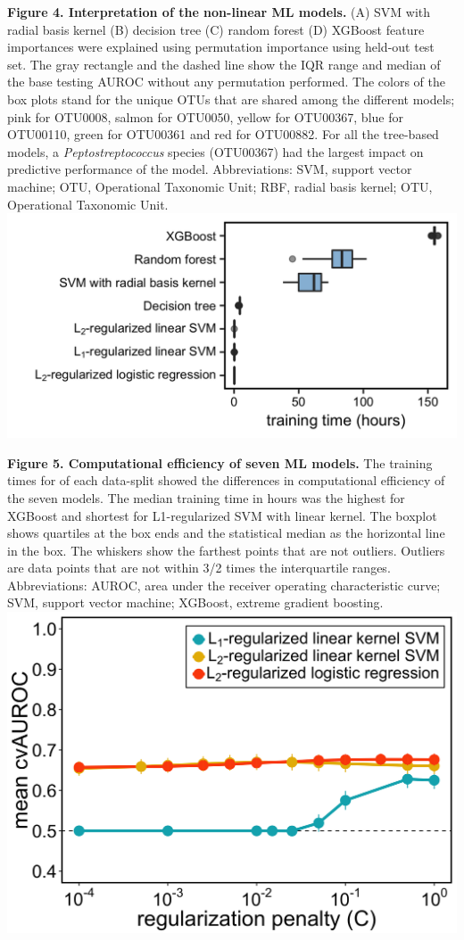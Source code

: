 \documentclass[11pt,]{article}
\begin{document}
\textbf{Figure 4. Interpretation of the non-linear ML models.} (A) SVM
with radial basis kernel (B) decision tree (C) random forest (D) XGBoost
feature importances were explained using permutation importance using
held-out test set. The gray rectangle and the dashed line show the IQR
range and median of the base testing AUROC without any permutation
performed. The colors of the box plots stand for the unique OTUs that
are shared among the different models; pink for OTU0008, salmon for
OTU0050, yellow for OTU00367, blue for OTU00110, green for OTU00361 and
red for OTU00882. For all the tree-based models, a
\emph{Peptostreptococcus} species (OTU00367) had the largest impact on
predictive performance of the model. Abbreviations: SVM, support vector
machine; OTU, Operational Taxonomic Unit; RBF, radial basis kernel; OTU,
Operational Taxonomic Unit. \newpage
\includegraphics{Figure_5.png}

\textbf{Figure 5. Computational efficiency of seven ML models.} The
training times for of each data-split showed the differences in
computational efficiency of the seven models. The median training time
in hours was the highest for XGBoost and shortest for L1-regularized SVM
with linear kernel. The boxplot shows quartiles at the box ends and the
statistical median as the horizontal line in the box. The whiskers show
the farthest points that are not outliers. Outliers are data points that
are not within 3/2 times the interquartile ranges. Abbreviations: AUROC,
area under the receiver operating characteristic curve; SVM, support
vector machine; XGBoost, extreme gradient boosting. \newpage
\includegraphics{Figure_S1.png}
\end{document}
